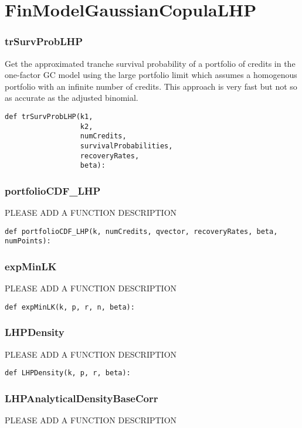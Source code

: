 \documentclass[twoside,11pt]{book}
\begin{document}
\newpage
\section{FinModelGaussianCopulaLHP}

\subsubsection*{{\bf trSurvProbLHP}}
Get the approximated tranche survival probability of a portfolio of credits in the one-factor GC model using the large portfolio limit which assumes a homogenous portfolio with an infinite number of credits. This approach is very fast but not so as accurate as the adjusted binomial.  

\begin{lstlisting}
def trSurvProbLHP(k1,
                  k2,
                  numCredits,
                  survivalProbabilities,
                  recoveryRates,
                  beta):
\end{lstlisting}

\subsubsection*{{\bf portfolioCDF\_LHP}}
PLEASE ADD A FUNCTION DESCRIPTION

\begin{lstlisting}
def portfolioCDF_LHP(k, numCredits, qvector, recoveryRates, beta, numPoints):
\end{lstlisting}

\subsubsection*{{\bf expMinLK}}
PLEASE ADD A FUNCTION DESCRIPTION

\begin{lstlisting}
def expMinLK(k, p, r, n, beta):
\end{lstlisting}

\subsubsection*{{\bf LHPDensity}}
PLEASE ADD A FUNCTION DESCRIPTION

\begin{lstlisting}
def LHPDensity(k, p, r, beta):
\end{lstlisting}

\subsubsection*{{\bf LHPAnalyticalDensityBaseCorr}}
PLEASE ADD A FUNCTION DESCRIPTION
\end{document}
